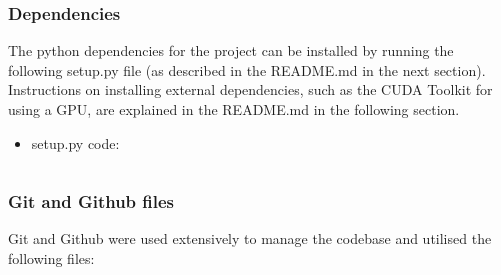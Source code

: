 \documentclass[./project-report/src/latex/project-report.tex]{subfiles}
\begin{document}
\subsubsection{Dependencies}

The python dependencies for the project can be installed by running the following setup.py file (as described in the README.md in the next section). Instructions on 
installing external dependencies, such as the CUDA Toolkit for using a GPU, are explained in the README.md in the following section.

\begin{itemize}
    \item setup.py code:
        \inputminted{python}{./setup.py}
\end{itemize}

\subsubsection{Git and Github files}

Git and Github were used extensively to manage the codebase and utilised the following files:
\end{document}

